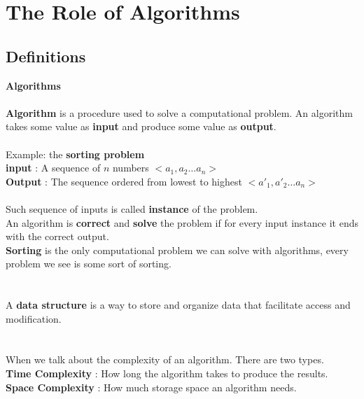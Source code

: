 \chapter{The Role of Algorithms}
\section{Definitions}
{\Large\textbf{Algorithms}}\\\\ 
\textbf{Algorithm} is a procedure used to solve a computational problem.
An algorithm takes some value as \textbf{input} and produce some value as \textbf{output}.
\\\\
Example: the \textbf{sorting problem}\\
\indent \textbf{input} : A sequence of $n$ numbers $<a_1,a_2\dots a_n>$\\
\indent \textbf{Output} : The sequence ordered from lowest to highest $<a'_{1},a'_{2}\dots a_n>$
\\\\
Such sequence of inputs is called \textbf{instance} of the problem.\\
An algorithm is \textbf{correct} and \textbf{solve} the problem if for every input instance it ends with the correct output.\\
\textbf{Sorting} is the only computational problem we can solve with algorithms, every problem we see is some sort of sorting.\\ 
\\
\\ 
A \textbf{data structure} is a way to store and organize data that facilitate access and modification. 
\\\\
\\
When we talk about the complexity of an algorithm. There are two types.\\
\indent \textbf{Time Complexity} : How long the algorithm takes to produce the results. \\
\indent\textbf{Space Complexity} : How much storage space an algorithm needs.


    


